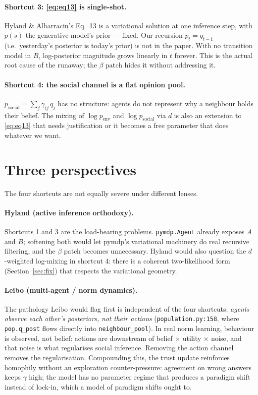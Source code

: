 \documentclass[11pt,a4paper]{article}
\newcommand{\code}[1]{\texttt{\small #1}}
\begin{document}
\paragraph{Shortcut 3: \eqref{eq:eq13} is single-shot.}
Hyland \& Albarracin's Eq.~13 is a variational solution at one inference step,
with $p(s)$ the generative model's prior --- fixed. Our recursion
$p_t = q_{t-1}$ (i.e.\ yesterday's posterior is today's prior) is not in the
paper. With no transition model in $B$, log-posterior magnitude grows
linearly in $t$ forever. This is the actual root cause of the runaway; the
$\beta$ patch hides it without addressing it.

\paragraph{Shortcut 4: the social channel is a flat opinion pool.}
$p_{\text{social}} = \sum_j \gamma_{ij}\,q_j$ has no structure: agents do
not represent why a neighbour holds their belief. The mixing of
$\log p_{\text{env}}$ and $\log p_{\text{social}}$ via $d$ is also an
extension to \eqref{eq:eq13} that needs justification or it becomes a free
parameter that does whatever we want.

\section{Three perspectives}
\label{sec:perspectives}

The four shortcuts are not equally severe under different lenses.

\paragraph{Hyland (active inference orthodoxy).} Shortcuts 1 and 3 are the
load-bearing problems. \code{pymdp.Agent} already exposes $A$ and $B$;
softening both would let pymdp's variational machinery do real recursive
filtering, and the $\beta$ patch becomes unnecessary. Hyland would also
question the $d$-weighted log-mixing in shortcut 4: there is a coherent
two-likelihood form (Section~\ref{sec:fix}) that respects the variational
geometry.

\paragraph{Leibo (multi-agent / norm dynamics).} The pathology Leibo would
flag first is independent of the four shortcuts: \emph{agents observe each
other's posteriors, not their actions} (\code{population.py:158}, where
\code{pop.q\_post} flows directly into \code{neighbour\_pool}). In real norm
learning, behaviour is observed, not belief: actions are downstream of belief
$\times$ utility $\times$ noise, and that noise is what regularises social
inference. Removing the action channel removes the regularisation. Compounding
this, the trust update reinforces homophily without an exploration
counter-pressure: agreement on wrong answers keeps $\gamma$ high; the model
has no parameter regime that produces a paradigm shift instead of lock-in,
which a model of paradigm shifts ought to.
\end{document}
